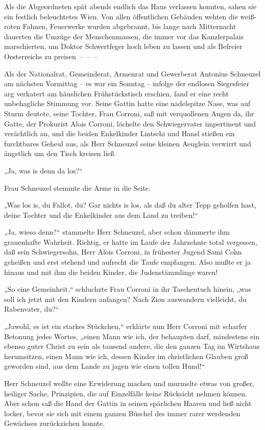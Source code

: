 Als die Abgeordneten spät abends endlich das Haus verlassen
konnten, sahen sie ein festlich beleuchtetes Wien. Von allen
öffentlichen Gebäuden wehten die weiß-roten Fahnen, Feuerwerke
wurden abgebrannt, bis lange nach  Mitternacht
dauerten die Umzüge der Menschenmassen, die immer vor das
Kanzlerpalais marschierten, um Doktor Schwertfeger hoch leben zu
lassen und als Befreier Oesterreichs zu preisen~–~–~–

\tb{* * *}
Als der Nationalrat, Gemeinderat, Armenrat und Gewerberat Antonius
Schneuzel am nächsten Vormittag – es war ein Sonntag – infolge der
endlosen Siegesfeier arg verkatert am häuslichen Frühstückstisch
erschien, fand er eine recht unbehagliche Stimmung vor. Seine
Gattin hatte eine nadelspitze Nase, was auf Sturm deutete, seine
Tochter, Frau Corroni, saß mit verquollenen Augen da, ihr Gatte,
der Prokurist Alois Corroni, lächelte den Schwiegervater
impertinent und verächtlich an, und die beiden Enkelkinder Lintschi
und Hansl stießen ein furchtbares Geheul aus, als Herr Schneuzel
seine kleinen Aeuglein verwirrt und ängstlich um den Tisch kreisen
ließ.

„Ja, was is denn da los?“

Frau Schneuzel stemmte die Arme in die Seite.

„Was los is, du Fallot, du? Gar nichts is los, als daß du alter
Tepp geholfen hast, deine Tochter und die Enkelkinder aus dem Land
zu treiben!“

„Ja, wieso denn?“ stammelte Herr Schneuzel, aber schon dämmerte ihm
grauenhafte Wahrheit. Richtig, er hatte im Laufe der Jahrzehnte
total vergessen, daß sein Schwiegersohn, Herr Alois Corroni, in
frühester Jugend Sami Cohn geheißen und erst stehend und aufrecht
die  Taufe empfangen. Also mußte er ja hinaus und
mit ihm die beiden Kinder, die Judenstämmlinge waren!

„So eine Gemeinheit,“ schluchzte Frau Corroni in ihr Taschentuch
hinein, „was soll ich jetzt mit den Kindern anfangen? Nach Zion
auswandern vielleicht, du Rabenvater, du?“

„Jawohl, es ist ein starkes Stückchen,“ erklärte nun Herr Corroni
mit scharfer Betonung jedes Wortes, „einen Mann wie ich, der
behaupten darf, mindestens ein ebenso guter Christ zu sein als
tausend andere, die den ganzen Tag im Wirtshaus herumsitzen, einen
Mann wie ich, dessen Kinder im christlichen Glauben groß geworden
sind, aus dem Lande zu jagen wie einen tollen Hund!“

Herr Schneuzel wollte eine Erwiderung machen und murmelte etwas von
großer, heiliger Sache, Prinzipien, die auf Einzelfälle keine
Rücksicht nehmen können. Aber schon saß die Hand der Gattin in
seinen spärlichen Haaren und ließ nicht locker, bevor sie sich mit
einem ganzen Büschel des immer rarer werdenden Gewächses
zurückziehen konnte.

